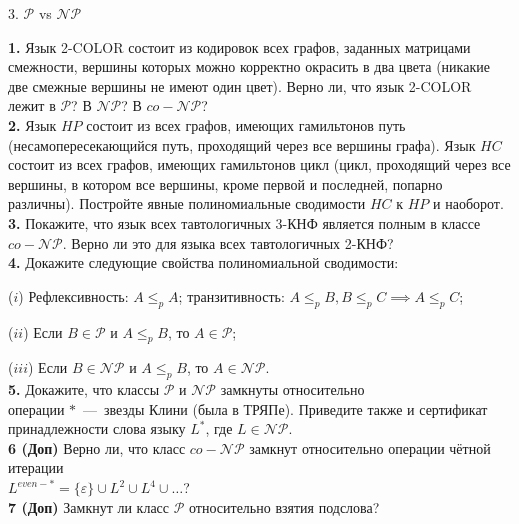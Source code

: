 \documentclass[11pt,a5paper,fleqn]{article}
\begin{document}
\begin{center}
{ \Large 3. $\mathcal{P}$ vs $\mathcal{NP}$}

\end{center}
{\bf 1.} Язык 2-COLOR состоит из кодировок всех графов, заданных матрицами смежности, вершины которых можно корректно окрасить в два цвета (никакие две смежные вершины не имеют один цвет). Верно ли, что язык 2-COLOR лежит в $\mathcal{P}$? В $\mathcal{NP}$? В $co-\mathcal{NP}$?\\
\smallskip
{\bf 2.}  Язык $HP$ состоит из всех графов, имеющих гамильтонов путь (несамопересекающийся путь, проходящий через все вершины графа). Язык $HC$ состоит из всех графов, имеющих гамильтонов цикл (цикл, проходящий через все вершины, в котором все вершины, кроме первой и последней, попарно различны).
Постройте явные полиномиальные сводимости $HC$ к $HP$ и наоборот.\\
\smallskip
{\bf 3.}  Покажите, что язык всех тавтологичных 3-КНФ является полным в классе $co-\mathcal{NP}$. Верно ли это для языка всех тавтологичных 2-КНФ? \\
\smallskip
{\bf 4.}  Докажите следующие свойства полиномиальной сводимости:

($i$) Рефлексивность: $A\leq_p A$; транзитивность: $A\leq_p B, B\leq_p C \implies A\leq_p C$;

($ii$) Если $B\in\mathcal{P}$ и $A\leq_p B$, то $A\in\mathcal{P}$;

($iii$) Если $B\in\mathcal{NP}$ и $A\leq_p B$, то $A\in\mathcal{NP}$.\\
\smallskip
{\bf 5.}  Докажите, что классы $\mathcal{P}$ и $\mathcal{NP}$ замкнуты относительно \\
операции $*$~---~звезды Клини (была в ТРЯПе). Приведите также и сертификат принадлежности слова языку $L^*$, где $L\in\mathcal{NP}$. \\
\smallskip
{\bf 6 (Доп)}  Верно ли, что класс $co-\mathcal{NP}$ замкнут относительно операции чётной итерации \\
$L^{even-*} = \{\varepsilon\} \cup L^2 \cup L^4 \cup\dotsc$? \\
\smallskip
{\bf 7 (Доп)} Замкнут ли класс $\mathcal{P}$ относительно взятия подслова? \\
\end{document}
